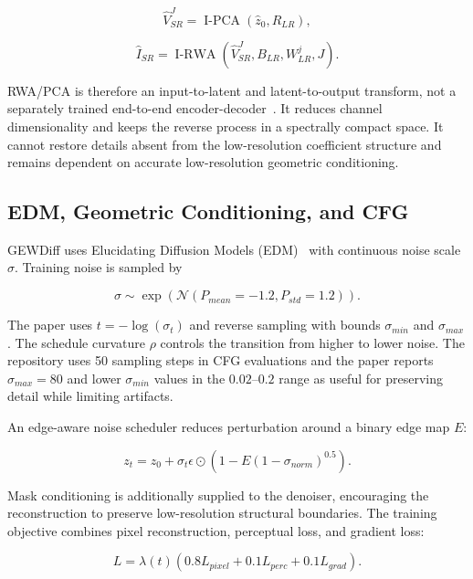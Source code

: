 \documentclass[10pt,twocolumn,letterpaper]{article}
\begin{document}
\begin{equation}
    \hat{V}^{J}_{SR}=\operatorname{I-PCA}(\hat{z}_0,R_{LR}),
\end{equation}

\begin{equation}
    \hat{I}_{SR}=\operatorname{I-RWA}(\hat{V}^{J}_{SR},B_{LR},W^j_{LR},J).
\end{equation}

RWA/PCA is therefore an input-to-latent and latent-to-output transform, not a separately trained end-to-end encoder-decoder~\cite{amrani2016rwa}. It reduces channel dimensionality and keeps the reverse process in a spectrally compact space. It cannot restore details absent from the low-resolution coefficient structure and remains dependent on accurate low-resolution geometric conditioning.

\subsection{EDM, Geometric Conditioning, and CFG}

GEWDiff uses Elucidating Diffusion Models (EDM)~\cite{karras2022edm} with continuous noise scale $\sigma$. Training noise is sampled by

\begin{equation}
    \sigma\sim\exp(\mathcal{N}(P_{mean}=-1.2,P_{std}=1.2)).
\end{equation}

The paper uses $t=-\log(\sigma_t)$ and reverse sampling with bounds $\sigma_{min}$ and $\sigma_{max}$. The schedule curvature $\rho$ controls the transition from higher to lower noise. The repository uses 50 sampling steps in CFG evaluations and the paper reports $\sigma_{max}=80$ and lower $\sigma_{min}$ values in the $0.02$--$0.2$ range as useful for preserving detail while limiting artifacts.

An edge-aware noise scheduler reduces perturbation around a binary edge map $E$:

\begin{equation}
    z_t=z_0+\sigma_t\epsilon\odot(1-E(1-\sigma_{norm})^{0.5}).
\end{equation}

Mask conditioning is additionally supplied to the denoiser, encouraging the reconstruction to preserve low-resolution structural boundaries. The training objective combines pixel reconstruction, perceptual loss, and gradient loss:

\begin{equation}
    L=\lambda(t)(0.8L_{pixel}+0.1L_{perc}+0.1L_{grad}).
\end{equation}
\end{document}
